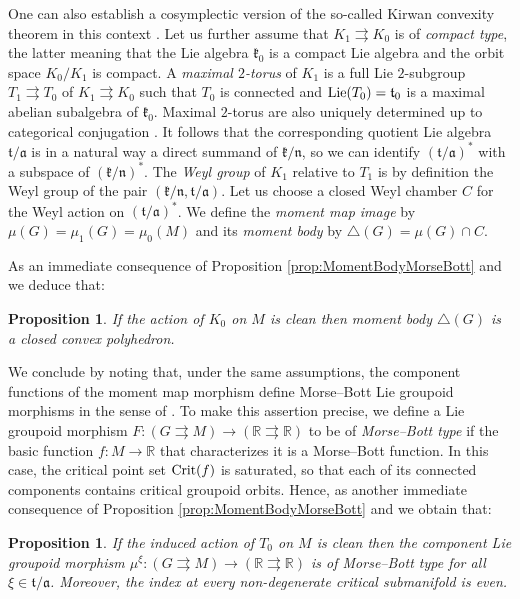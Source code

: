 \documentclass[
  a4paper, 
  reqno, 
  oneside, 
  12pt
]{amsart}
\newtheorem{proposition}[theorem]{Proposition}
\theoremstyle{definition}
\theoremstyle{remark}
\newcommand{\rr}{\rightrightarrows}
\begin{document}
One can also establish a cosymplectic version of the so-called Kirwan convexity theorem in this context \cite{Kirwan}. Let us further assume that $K_1\rr K_0$ is of \emph{compact type}, the latter meaning that the Lie algebra $\mathfrak{k}_0$ is a compact Lie algebra and the orbit space $K_0/K_1$ is compact. A \emph{maximal $2$-torus} of $K_1$ is a full Lie $2$-subgroup $T_1\rr T_0$ of $K_1\rr K_0$ such that $T_0$ is connected and $\textnormal{Lie}(T_0)=\mathfrak{t}_0$ is a maximal abelian subalgebra of $\mathfrak{k}_0$. Maximal $2$-torus are also uniquely determined up to categorical conjugation \cite[s. 6.12]{HoffmanSjamaar}. It follows that the corresponding quotient Lie algebra $\mathfrak{t}/\mathfrak{a}$ is in a natural way a direct summand of $\mathfrak{k}/\mathfrak{n}$, so we can identify $(\mathfrak{t}/\mathfrak{a})^\ast$ with a subspace of $(\mathfrak{k}/\mathfrak{n})^\ast$. The \emph{Weyl group} of $K_1$ relative to $T_1$ is by definition the Weyl group of the pair $(\mathfrak{k}/\mathfrak{n},\mathfrak{t}/\mathfrak{a})$. Let us choose a closed Weyl chamber $C$ for the Weyl action on $(\mathfrak{t}/\mathfrak{a})^\ast$. We define the \emph{moment map image} by $\mu(G)=\mu_1(G)=\mu_0(M)$ and its \emph{moment body} by $\triangle(G)=\mu(G)\cap C$. 

As an immediate consequence of Proposition \ref{prop:MomentBodyMorseBott} and \cite[Prop. 7.4.1]{HoffmanSjamaar} we deduce that:

\begin{proposition}
If the action of $K_0$ on $M$ is clean then moment body $\triangle(G)$ is a closed convex polyhedron.
\end{proposition}

We conclude by noting that, under the same assumptions, the component functions of the moment map morphism define Morse–Bott Lie groupoid morphisms in the sense of \cite{OrtizValencia}. To make this assertion precise, we define a Lie groupoid morphism $F:(G\rr M)\to (\mathbb{R}\rr \mathbb{R})$ to be of \emph{Morse--Bott type} if the basic function $f:M\to \mathbb{R}$ that characterizes it is a Morse--Bott function. In this case, the critical point set $\textnormal{Crit}(f)$ is saturated, so that each of its connected components contains critical groupoid orbits. Hence, as another immediate consequence of Proposition \ref{prop:MomentBodyMorseBott} and \cite[Prop. 4.18]{OrtizValencia} we obtain that:

\begin{proposition}
If the induced action of $T_0$ on $M$ is clean then the component Lie groupoid morphism $\mu^\xi: (G\rr M)\to (\mathbb{R}\rr \mathbb{R})$ is of Morse--Bott type for all $\xi\in \mathfrak{t}/\mathfrak{a}$. Moreover, the index at every non-degenerate critical submanifold is even.
\end{proposition}
\end{document}
